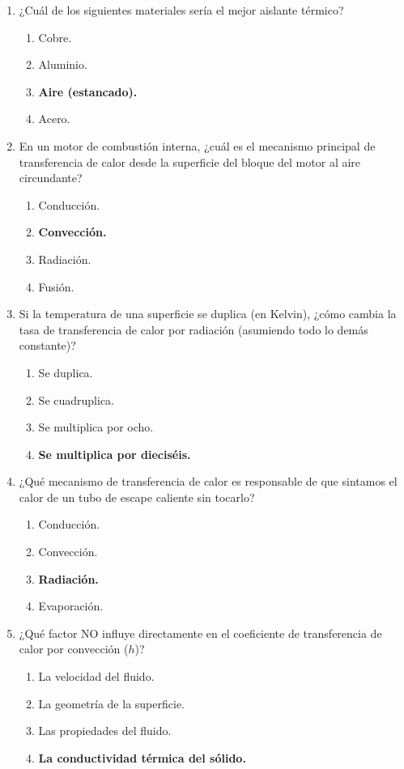 \documentclass{article}
\begin{document}
\begin{enumerate}[label=\arabic*.]
    \item ¿Cuál de los siguientes materiales sería el mejor aislante térmico?
    \begin{enumerate}[label=\alph*)]
        \item Cobre.
        \item Aluminio.
        \item \textbf{Aire (estancado).}
        \item Acero.
    \end{enumerate}

    \item En un motor de combustión interna, ¿cuál es el mecanismo principal de transferencia de calor desde la superficie del bloque del motor al aire circundante?
    \begin{enumerate}[label=\alph*)]
        \item Conducción.
        \item \textbf{Convección.}
        \item Radiación.
        \item Fusión.
    \end{enumerate}

    \item Si la temperatura de una superficie se duplica (en Kelvin), ¿cómo cambia la tasa de transferencia de calor por radiación (asumiendo todo lo demás constante)?
    \begin{enumerate}[label=\alph*)]
        \item Se duplica.
        \item Se cuadruplica.
        \item Se multiplica por ocho.
        \item \textbf{Se multiplica por dieciséis.}
    \end{enumerate}

    \item ¿Qué mecanismo de transferencia de calor es responsable de que sintamos el calor de un tubo de escape caliente sin tocarlo?
    \begin{enumerate}[label=\alph*)]
        \item Conducción.
        \item Convección.
        \item \textbf{Radiación.}
        \item Evaporación.
    \end{enumerate}

    \item ¿Qué factor NO influye directamente en el coeficiente de transferencia de calor por convección ($h$)?
    \begin{enumerate}[label=\alph*)]
        \item La velocidad del fluido.
        \item La geometría de la superficie.
        \item Las propiedades del fluido.
        \item \textbf{La conductividad térmica del sólido.}
    \end{enumerate}


\end{enumerate}
\end{document}
